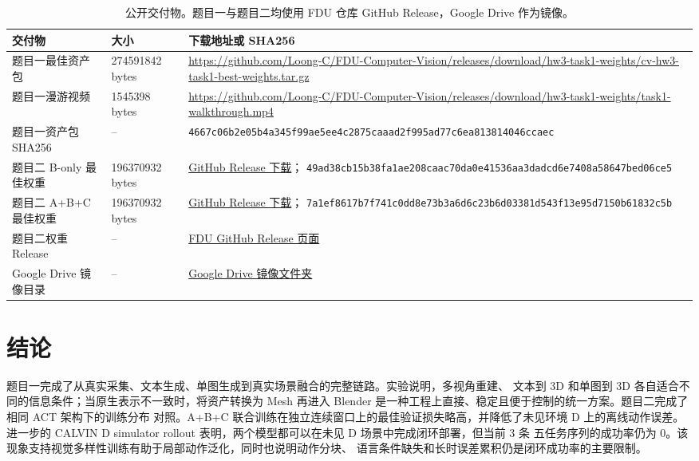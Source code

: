 \documentclass[10pt,a4paper,UTF8,fontset=windows]{ctexart}
\newcommand{\code}[1]{\texttt{\small #1}}
\newcommand{\tasktworelease}{https://github.com/Loong-C/FDU-Computer-Vision/releases/tag/hw3-task2-formal-partial-v1}
\newcommand{\tasktwobweights}{https://github.com/Loong-C/FDU-Computer-Vision/releases/download/hw3-task2-formal-partial-v1/hw3-task2-act-b-only-best.pt}
\newcommand{\tasktwoabcweights}{https://github.com/Loong-C/FDU-Computer-Vision/releases/download/hw3-task2-formal-partial-v1/hw3-task2-act-abc-joint-best.pt}
\newcommand{\clouddrive}{https://drive.google.com/drive/folders/1v9oc1uTbZS31SaDJaT7sYV8m5dutMo1y?usp=drive_link}
\begin{document}
\begin{table}[H]
\centering
\caption{公开交付物。题目一与题目二均使用 FDU 仓库 GitHub Release，Google Drive 作为镜像。}
\label{tab:deliverables}
\small
\begin{tabularx}{0.98\textwidth}{p{3.2cm}p{2.4cm}Y}
\toprule
交付物 & 大小 & 下载地址或 SHA256 \\
\midrule
题目一最佳资产包 &
274591842 bytes &
\url{https://github.com/Loong-C/FDU-Computer-Vision/releases/download/hw3-task1-weights/cv-hw3-task1-best-weights.tar.gz} \\
题目一漫游视频 &
1545398 bytes &
\url{https://github.com/Loong-C/FDU-Computer-Vision/releases/download/hw3-task1-weights/task1-walkthrough.mp4} \\
题目一资产包 SHA256 &
-- &
\code{4667c06b2e05b4a345f99ae5ee4c2875caaad2f995ad77c6ea813814046ccaec} \\
题目二 B-only 最佳权重 &
196370932 bytes &
\href{\tasktwobweights}{GitHub Release 下载}；
\code{49ad38cb15b38fa1ae208caac70da0e41536aa3dadcd6e7408a58647bed06ce5} \\
题目二 A+B+C 最佳权重 &
196370932 bytes &
\href{\tasktwoabcweights}{GitHub Release 下载}；
\code{7a1ef8617b7f741c0dd8e73b3a6d6c23b6d03381d543f13e95d7150b61832c5b} \\
题目二权重 Release &
-- &
\href{\tasktworelease}{FDU GitHub Release 页面} \\
Google Drive 镜像目录 &
-- &
\href{\clouddrive}{Google Drive 镜像文件夹} \\
\bottomrule
\end{tabularx}
\end{table}

\clearpage
\section{结论}

题目一完成了从真实采集、文本生成、单图生成到真实场景融合的完整链路。实验说明，多视角重建、
文本到 3D 和单图到 3D 各自适合不同的信息条件；当原生表示不一致时，将资产转换为 Mesh 再进入
Blender 是一种工程上直接、稳定且便于控制的统一方案。题目二完成了相同 ACT 架构下的训练分布
对照。A+B+C 联合训练在独立连续窗口上的最佳验证损失略高，并降低了未见环境 D 上的离线动作误差。进一步的
CALVIN D simulator rollout 表明，两个模型都可以在未见 D 场景中完成闭环部署，但当前 3 条
五任务序列的成功率仍为 0。该现象支持视觉多样性训练有助于局部动作泛化，同时也说明动作分块、
语言条件缺失和长时误差累积仍是闭环成功率的主要限制。
\end{document}
